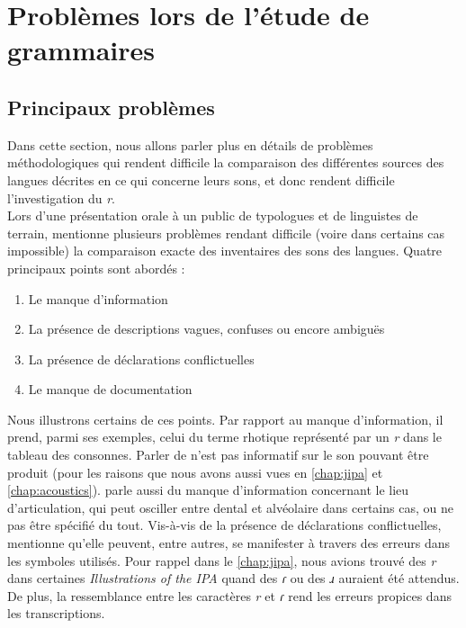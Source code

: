 \section{Problèmes lors de l'étude de grammaires}

\subsection{Principaux problèmes}

Dans cette section, nous allons parler plus en détails de problèmes méthodologiques qui rendent difficile la comparaison des différentes sources des langues décrites en ce qui concerne leurs sons, et donc rendent difficile l'investigation du \textit{r}.\\

Lors d'une présentation orale à un public de typologues et de linguistes de terrain, \textcite{maddiesonPhoneticAdequacyDescriptive2021} mentionne plusieurs problèmes rendant difficile (voire dans certains cas impossible) la comparaison exacte des inventaires des sons des langues.
Quatre principaux points sont abordés :
\begin{enumerate}
	\item Le manque d'information
	\item La présence de descriptions vagues, confuses ou encore ambiguës
	\item La présence de déclarations conflictuelles
	\item Le manque de documentation
\end{enumerate}

Nous illustrons certains de ces points. Par rapport au manque d'information, il prend, parmi ses exemples, celui du terme rhotique représenté par un \textit{r} dans le tableau des consonnes. Parler de  n'est pas informatif sur le son pouvant être produit (pour les raisons que nous avons aussi vues en \autoref{chap:jipa} et \autoref{chap:acoustics}). \citeauthor{maddiesonPhoneticAdequacyDescriptive2021} parle aussi du manque d'information concernant le lieu d'articulation, qui peut osciller entre dental et alvéolaire dans certains cas, ou ne pas être spécifié du tout.
Vis-à-vis de la présence de déclarations conflictuelles, \citeauthor{maddiesonPhoneticAdequacyDescriptive2021} mentionne qu'elle peuvent, entre autres, se manifester à travers des erreurs dans les symboles utilisés. Pour rappel dans le \autoref{chap:jipa}, nous avions trouvé des \textit{r} dans certaines \textit{Illustrations of the IPA} quand des \textit{ɾ} ou des \textit{ɹ} auraient été attendus. De plus, la ressemblance entre les caractères \textit{r} et \textit{ɾ} rend les erreurs propices dans les transcriptions.\\

